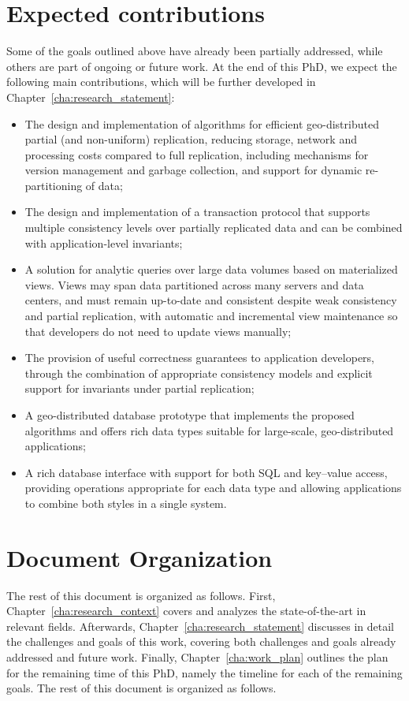 \section{Expected contributions}

Some of the goals outlined above have already been partially addressed, while others are part of ongoing or future work.
At the end of this PhD, we expect the following main contributions, which will be further developed in Chapter~\ref{cha:research_statement}:

\begin{itemize}
  \item The design and implementation of algorithms for efficient geo-distributed partial (and non-uniform) replication, reducing storage, network and processing costs compared to full replication, including mechanisms for version management and garbage collection, and support for dynamic re-partitioning of data;
  \item The design and implementation of a transaction protocol that supports multiple consistency levels over partially replicated data and can be combined with application-level invariants;
  \item A solution for analytic queries over large data volumes based on materialized views.
        Views may span data partitioned across many servers and data centers, and must remain up-to-date and consistent despite weak consistency and partial replication, with automatic and incremental view maintenance so that developers do not need to update views manually;
  \item The provision of useful correctness guarantees to application developers, through the combination of appropriate consistency models and explicit support for invariants under partial replication;
  \item A geo-distributed database prototype that implements the proposed algorithms and offers rich data types suitable for large-scale, geo-distributed applications;
  \item A rich database interface with support for both SQL and key–value access, providing operations appropriate for each data type and allowing applications to combine both styles in a single system.
\end{itemize}

\section{Document Organization}

The rest of this document is organized as follows. First, Chapter~\ref{cha:research_context} covers and analyzes the state-of-the-art in relevant fields. 
Afterwards, Chapter~\ref{cha:research_statement} discusses in detail the challenges and goals of this work, covering both challenges and goals already addressed and future work. 
Finally, Chapter~\ref{cha:work_plan} outlines the plan for the remaining time of this PhD, namely the timeline for each of the remaining goals.
The rest of this document is organized as follows.
